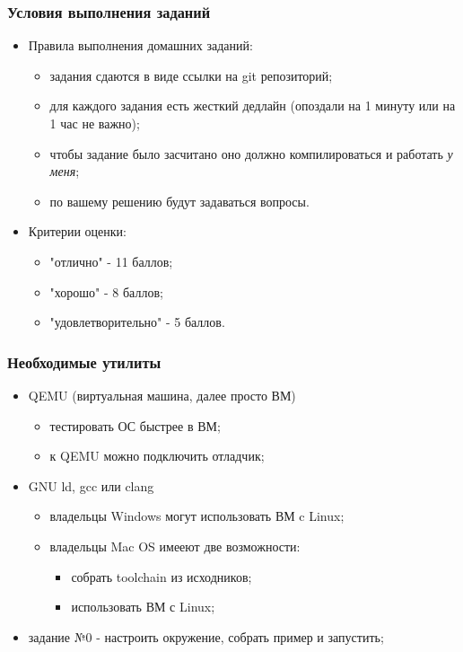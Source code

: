 \begin{frame}
\frametitle{Условия выполнения заданий}
\begin{itemize}
  \item Правила выполнения домашних заданий:
  \begin{itemize}
    \item задания сдаются в виде ссылки на git репозиторий;
    \item для каждого задания есть жесткий дедлайн (опоздали на 1 минуту или на
    1 час не важно);
    \item чтобы задание было засчитано оно должно компилироваться и работать
    \emph{у меня};
    \item по вашему решению будут задаваться вопросы.
  \end{itemize}
  \item Критерии оценки:
  \begin{itemize}
    \item "отлично" - 11 баллов;
    \item "хорошо" - 8 баллов;
    \item "удовлетворительно" - 5 баллов.
  \end{itemize}
\end{itemize}
\end{frame}

\begin{frame}
\frametitle{Необходимые утилиты}
\begin{itemize}
  \item QEMU (виртуальная машина, далее просто ВМ)
  \begin{itemize}
    \item тестировать ОС быстрее в ВМ;
    \item к QEMU можно подключить отладчик;
  \end{itemize}
  \item GNU ld, gcc или clang
  \begin{itemize}
    \item владельцы Windows могут использовать ВМ c Linux;
    \item владельцы Mac OS имееют две возможности:
    \begin{itemize}
      \item собрать toolchain из исходников;
      \item использовать ВМ с Linux;
    \end{itemize}
  \end{itemize}
  \item задание №0 - настроить окружение, собрать пример и запустить;
\end{itemize}
\end{frame}

